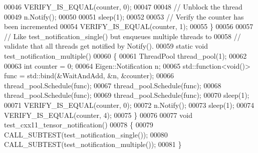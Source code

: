 \begin{DoxyCode}
00046   VERIFY\_IS\_EQUAL(counter, 0);
00047 
00048   \textcolor{comment}{// Unblock the thread}
00049   n.Notify();
00050 
00051   sleep(1);
00052 
00053   \textcolor{comment}{// Verify the counter has been incremented}
00054   VERIFY\_IS\_EQUAL(counter, 1);
00055 \}
00056 
00057 \textcolor{comment}{// Like test\_notification\_single() but enqueues multiple threads to}
00058 \textcolor{comment}{// validate that all threads get notified by Notify().}
00059 \textcolor{keyword}{static} \textcolor{keywordtype}{void} test\_notification\_multiple()
00060 \{
00061   ThreadPool thread\_pool(1);
00062 
00063   \textcolor{keywordtype}{int} counter = 0;
00064   Eigen::Notification n;
00065   std::function<void()> func = std::bind(&WaitAndAdd, &n, &counter);
00066   thread\_pool.Schedule(func);
00067   thread\_pool.Schedule(func);
00068   thread\_pool.Schedule(func);
00069   thread\_pool.Schedule(func);
00070   sleep(1);
00071   VERIFY\_IS\_EQUAL(counter, 0);
00072   n.Notify();
00073   sleep(1);
00074   VERIFY\_IS\_EQUAL(counter, 4);
00075 \}
00076 
00077 \textcolor{keywordtype}{void} test\_cxx11\_tensor\_notification()
00078 \{
00079   CALL\_SUBTEST(test\_notification\_single());
00080   CALL\_SUBTEST(test\_notification\_multiple());
00081 \}
\end{DoxyCode}
